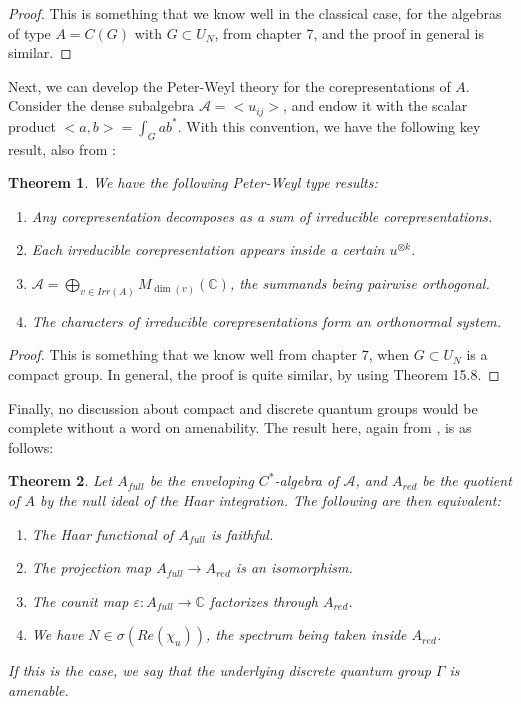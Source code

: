 \documentclass[12pt]{amsbook}
\newtheorem{theorem}{Theorem}[chapter]
\begin{document}
\begin{proof}
This is something that we know well in the classical case, for the algebras of type $A=C(G)$ with $G\subset U_N$, from chapter 7, and the proof in general is similar.
\end{proof}

Next, we can develop the Peter-Weyl theory for the corepresentations of $A$. Consider the dense subalgebra $\mathcal A=<u_{ij}>$, and endow it with the scalar product $<a,b>=\int_Gab^*$. With this convention, we have the following key result, also from \cite{wo1}:

\begin{theorem}
We have the following Peter-Weyl type results:
\begin{enumerate}
\item Any corepresentation decomposes as a sum of irreducible corepresentations.

\item Each irreducible corepresentation appears inside a certain $u^{\otimes k}$.

\item $\mathcal A=\bigoplus_{v\in Irr(A)}M_{\dim(v)}(\mathbb C)$, the summands being pairwise orthogonal.

\item The characters of irreducible corepresentations form an orthonormal system.
\end{enumerate}
\end{theorem}

\begin{proof}
This is something that we know well from chapter 7, when $G\subset U_N$ is a compact group. In general, the proof is quite similar, by using Theorem 15.8.
\end{proof}

Finally, no discussion about compact and discrete quantum groups would be complete without a word on amenability. The result here, again from \cite{wo1}, is as follows:

\begin{theorem}
Let $A_{full}$ be the enveloping $C^*$-algebra of $\mathcal A$, and $A_{red}$ be the quotient of $A$ by the null ideal of the Haar integration. The following are then equivalent:
\begin{enumerate}
\item The Haar functional of $A_{full}$ is faithful.

\item The projection map $A_{full}\to A_{red}$ is an isomorphism.

\item The counit map $\varepsilon:A_{full}\to\mathbb C$ factorizes through $A_{red}$.

\item We have $N\in\sigma(Re(\chi_u))$, the spectrum being taken inside $A_{red}$.
\end{enumerate}
If this is the case, we say that the underlying discrete quantum group $\Gamma$ is amenable.
\end{theorem}
\end{document}
